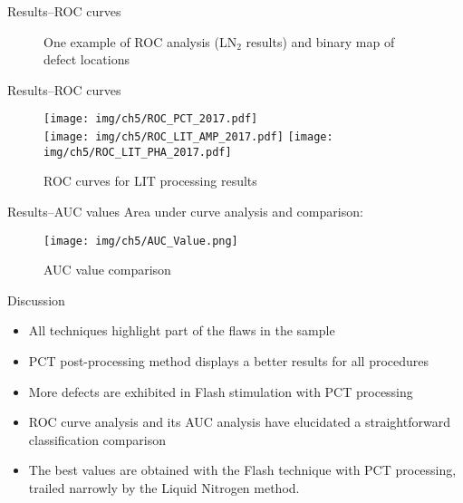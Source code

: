 \begin{frame}{Results--\small{ROC curves}}
    \begin{figure}[ht]
       \centering
       \caption{One example of ROC analysis (LN$_2$ results) and binary map of defect locations}
    \end{figure}
\end{frame}


\begin{frame}{Results--\small{ROC curves}}
    \begin{figure}
        \centering
            \texttt{[image: img/ch5/ROC\_PCT\_2017.pdf]}
        \\
            \texttt{[image: img/ch5/ROC\_LIT\_AMP\_2017.pdf]}
            \texttt{[image: img/ch5/ROC\_LIT\_PHA\_2017.pdf]}
        \caption{ROC curves for LIT processing results}
    \end{figure}

\end{frame}


\begin{frame}{Results--\small{AUC values}}
Area under curve analysis and comparison:
    \begin{figure}[ht]
        \vspace*{-5pt}
        \centering
        \texttt{[image: img/ch5/AUC\_Value.png]}
        \caption{AUC value comparison}
    \end{figure}
\end{frame}


\begin{frame}{Discussion}
    \begin{itemize}[<+->]
    \pause
        \item All techniques highlight part of the flaws in the sample
        \item PCT post-processing method displays a better results for all procedures
        \item More defects are exhibited in Flash stimulation with PCT processing
        \item ROC curve analysis and its AUC analysis have elucidated a  straightforward classification comparison
        \item The best values are obtained with the Flash technique with PCT processing, trailed narrowly by the Liquid Nitrogen method.
    \end{itemize}
\end{frame}
